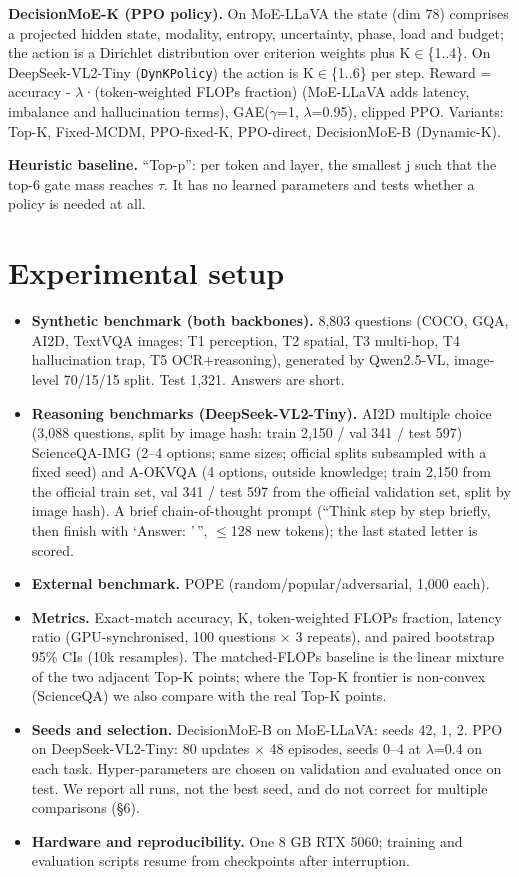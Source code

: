 \textbf{DecisionMoE-K (PPO policy).} On MoE-LLaVA the state (dim 78) comprises a projected hidden state, modality, entropy, uncertainty, phase, load and budget; the action is a Dirichlet distribution over criterion weights plus K$\in$\{1..4\}. On DeepSeek-VL2-Tiny (\texttt{DynKPolicy}) the action is K$\in$\{1..6\} per step. Reward = accuracy - $\lambda$·(token-weighted FLOPs fraction) (MoE-LLaVA adds latency, imbalance and hallucination terms), GAE($\gamma$=1, $\lambda$=0.95), clipped PPO. Variants: Top-K, Fixed-MCDM, PPO-fixed-K, PPO-direct, DecisionMoE-B (Dynamic-K).

\textbf{Heuristic baseline.} ``Top-p'': per token and layer, the smallest j such that the top-6 gate mass reaches $\tau$. It has no learned parameters and tests whether a policy is needed at all.

\section{Experimental setup}\label{experimental-setup}

\begin{itemize}
\tightlist
\item
  \textbf{Synthetic benchmark (both backbones).} 8,803 questions (COCO, GQA, AI2D, TextVQA images; T1 perception, T2 spatial, T3 multi-hop, T4 hallucination trap, T5 OCR+reasoning), generated by Qwen2.5-VL, image-level 70/15/15 split. Test 1,321. Answers are short.
\item
  \textbf{Reasoning benchmarks (DeepSeek-VL2-Tiny).} AI2D multiple choice (3,088 questions, split by image hash: train 2,150 / val 341 / test 597) ScienceQA-IMG (2--4 options; same sizes; official splits subsampled with a fixed seed) and A-OKVQA (4 options, outside knowledge; train 2,150 from the official train set, val 341 / test 597 from the official validation set, split by image hash). A brief chain-of-thought prompt (``Think step by step briefly, then finish with `Answer: '\,'', $\leq$128 new tokens); the last stated letter is scored.
\item
  \textbf{External benchmark.} POPE (random/popular/adversarial, 1,000 each).
\item
  \textbf{Metrics.} Exact-match accuracy, K, token-weighted FLOPs fraction, latency ratio (GPU-synchronised, 100 questions $\times$ 3 repeats), and paired bootstrap 95\% CIs (10k resamples). The matched-FLOPs baseline is the linear mixture of the two adjacent Top-K points; where the Top-K frontier is non-convex (ScienceQA) we also compare with the real Top-K points.
\item
  \textbf{Seeds and selection.} DecisionMoE-B on MoE-LLaVA: seeds 42, 1, 2. PPO on DeepSeek-VL2-Tiny: 80 updates $\times$ 48 episodes, seeds 0--4 at $\lambda$=0.4 on each task. Hyper-parameters are chosen on validation and evaluated once on test. We report all runs, not the best seed, and do not correct for multiple comparisons (§6).
\item
  \textbf{Hardware and reproducibility.} One 8 GB RTX 5060; training and evaluation scripts resume from checkpoints after interruption.
\end{itemize}

